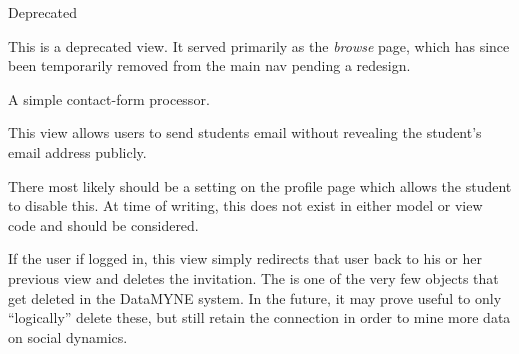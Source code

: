 \documentclass[letterpaper,10pt,english]{sphinxmanual}
\begin{document}

\begin{fulllineitems}
\label{generated/apps.profiles.views:apps.profiles.views.api}
Deprecated

\end{fulllineitems}



\begin{fulllineitems}
\label{generated/apps.profiles.views:apps.profiles.views.browse}
This is a deprecated view.  It served primarily as the \emph{browse} page, which has
since been temporarily removed from the main nav pending a redesign.

\end{fulllineitems}



\begin{fulllineitems}
\label{generated/apps.profiles.views:apps.profiles.views.contact}
A simple contact-form processor.

\end{fulllineitems}



\begin{fulllineitems}
\label{generated/apps.profiles.views:apps.profiles.views.contact_student}
This view allows users to send students email without revealing the
student's email address publicly.

There most likely should be a setting on the  profile page
which allows the student to disable this.  At time of writing, this
does not exist in either model or view code and should be considered.

\end{fulllineitems}



\begin{fulllineitems}
\label{generated/apps.profiles.views:apps.profiles.views.decline_invitation}
If the user if logged in, this view simply redirects that user back to his or
her previous view and deletes the invitation.  The  is one of the
very few objects that get deleted in the DataMYNE system.  In the future, it
may prove useful to only ``logically'' delete these, but still retain the connection
in order to mine more data on social dynamics.

\end{fulllineitems}
\end{document}
